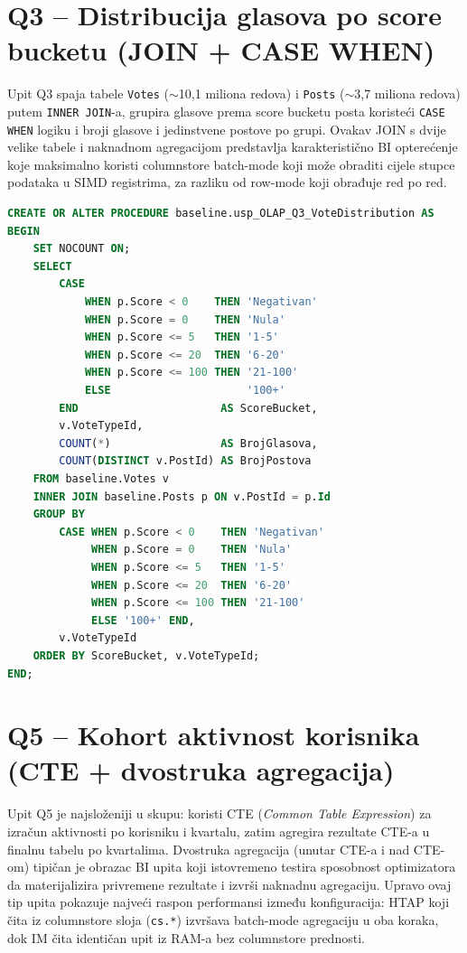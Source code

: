 \section{Q3 -- Distribucija glasova po score bucketu (JOIN + CASE WHEN)}

Upit Q3 spaja tabele \texttt{Votes} ($\sim$10,1 miliona redova) i \texttt{Posts} ($\sim$3,7 miliona redova) putem \texttt{INNER JOIN}-a, grupira glasove prema score bucketu posta koristeći \texttt{CASE WHEN} logiku i broji glasove i jedinstvene postove po grupi. Ovakav JOIN s dvije velike tabele i naknadnom agregacijom predstavlja karakteristično BI opterećenje koje maksimalno koristi columnstore batch-mode koji može obraditi cijele stupce podataka u SIMD registrima, za razliku od row-mode koji obrađuje red po red.

\begin{lstlisting}[language=SQL, caption={baseline.usp\_OLAP\_Q3\_VoteDistribution -- JOIN Votes--Posts s CASE WHEN bucketingom}, label=lst:b2]
CREATE OR ALTER PROCEDURE baseline.usp_OLAP_Q3_VoteDistribution AS
BEGIN
    SET NOCOUNT ON;
    SELECT
        CASE
            WHEN p.Score < 0    THEN 'Negativan'
            WHEN p.Score = 0    THEN 'Nula'
            WHEN p.Score <= 5   THEN '1-5'
            WHEN p.Score <= 20  THEN '6-20'
            WHEN p.Score <= 100 THEN '21-100'
            ELSE                     '100+'
        END                      AS ScoreBucket,
        v.VoteTypeId,
        COUNT(*)                 AS BrojGlasova,
        COUNT(DISTINCT v.PostId) AS BrojPostova
    FROM baseline.Votes v
    INNER JOIN baseline.Posts p ON v.PostId = p.Id
    GROUP BY
        CASE WHEN p.Score < 0    THEN 'Negativan'
             WHEN p.Score = 0    THEN 'Nula'
             WHEN p.Score <= 5   THEN '1-5'
             WHEN p.Score <= 20  THEN '6-20'
             WHEN p.Score <= 100 THEN '21-100'
             ELSE '100+' END,
        v.VoteTypeId
    ORDER BY ScoreBucket, v.VoteTypeId;
END;
\end{lstlisting}

\section{Q5 -- Kohort aktivnost korisnika (CTE + dvostruka agregacija)}
\label{sec:b3}

Upit Q5 je najsloženiji u skupu: koristi CTE (\textit{Common Table Expression}) za izračun aktivnosti po korisniku i kvartalu, zatim agregira rezultate CTE-a u finalnu tabelu po kvartalima. Dvostruka agregacija (unutar CTE-a i nad CTE-om) tipičan je obrazac BI upita koji istovremeno testira sposobnost optimizatora da materijalizira privremene rezultate i izvrši naknadnu agregaciju. Upravo ovaj tip upita pokazuje najveći raspon performansi između konfiguracija: HTAP koji čita iz columnstore sloja (\texttt{cs.*}) izvršava batch-mode agregaciju u oba koraka, dok IM čita identičan upit iz RAM-a bez columnstore prednosti.

